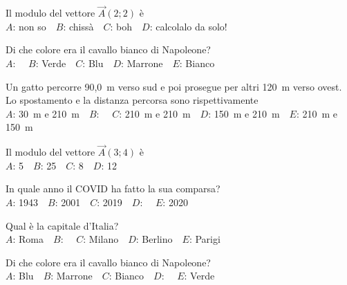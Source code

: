 \mcquestionheader Il modulo del vettore $\vec{A}(2;2)$ è\\
{$A$}: non so\ \ {$B$}: chissà\ \ {$C$}: boh\ \ {$D$}: calcolalo da solo!\ \ 

\mcquestionfooter



\def\mcquestionnumber{12}


\mcquestionheader Di che colore era il cavallo bianco di Napoleone?\\
{$A$}: \ \ {$B$}: Verde\ \ {$C$}: Blu\ \ {$D$}: Marrone\ \ {$E$}: Bianco\ \ 

\mcquestionfooter



\mcpaperfooter

\def\mcserialnumber{22}
\mcpaperheader


\def\mcquestionnumber{1}


\mcquestionheader Un gatto percorre 90,0~m verso sud e poi prosegue per altri 120~m verso ovest. Lo spostamento e la distanza percorsa sono rispettivamente\\
{$A$}: 30~m e 210~m\ \ {$B$}: \ \ {$C$}: 210~m e 210~m\ \ {$D$}: 150~m e 210~m\ \ {$E$}: 210~m e 150~m\ \ 

\mcquestionfooter



\def\mcquestionnumber{2}


\mcquestionheader Il modulo del vettore $\vec{A}(3;4)$ è\\
{$A$}: 5\ \ {$B$}: 25\ \ {$C$}: 8\ \ {$D$}: 12\ \ 

\mcquestionfooter



\def\mcquestionnumber{3}


\mcquestionheader In quale anno il COVID ha fatto la sua comparsa?\\
{$A$}: 1943\ \ {$B$}: 2001\ \ {$C$}: 2019\ \ {$D$}: \ \ {$E$}: 2020\ \ 

\mcquestionfooter



\def\mcquestionnumber{4}


\mcquestionheader Qual è la capitale d’Italia?\\
{$A$}: Roma\ \ {$B$}: \ \ {$C$}: Milano\ \ {$D$}: Berlino\ \ {$E$}: Parigi\ \ 

\mcquestionfooter



\def\mcquestionnumber{5}


\mcquestionheader Di che colore era il cavallo bianco di Napoleone?\\
{$A$}: Blu\ \ {$B$}: Marrone\ \ {$C$}: Bianco\ \ {$D$}: \ \ {$E$}: Verde\ \ 

